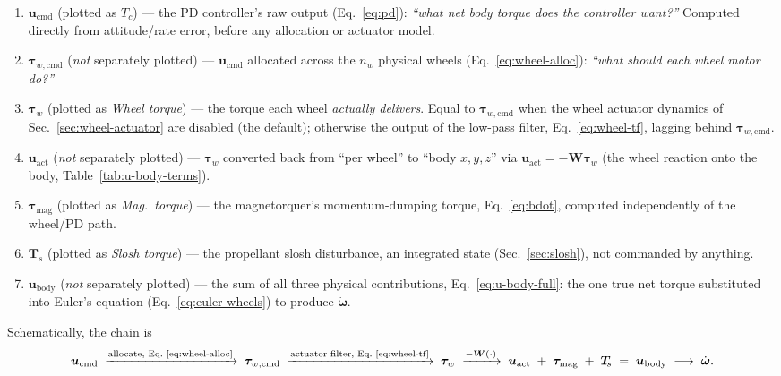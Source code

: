 \begin{enumerate}\setlength{\itemsep}{4pt}
\item $\bm{u}_{\text{cmd}}$ (plotted as $T_c$) --- the PD controller's
      raw output (Eq.~\ref{eq:pd}): \emph{``what net body torque does the
      controller want?''} Computed directly from attitude/rate error,
      before any allocation or actuator model.
\item $\bm{\tau}_{w,\text{cmd}}$ (\emph{not} separately plotted) ---
      $\bm{u}_{\text{cmd}}$ allocated across the $n_w$ physical wheels
      (Eq.~\ref{eq:wheel-alloc}): \emph{``what should each wheel motor
      do?''}
\item $\bm{\tau}_w$ (plotted as \emph{Wheel torque}) --- the torque each
      wheel \emph{actually delivers}. Equal to $\bm{\tau}_{w,\text{cmd}}$
      when the wheel actuator dynamics of Sec.~\ref{sec:wheel-actuator}
      are disabled (the default); otherwise the output of the low-pass
      filter, Eq.~\ref{eq:wheel-tf}, lagging behind
      $\bm{\tau}_{w,\text{cmd}}$.
\item $\bm{u}_{\text{act}}$ (\emph{not} separately plotted) --- $\bm{\tau}_w$
      converted back from ``per wheel'' to ``body $x,y,z$'' via
      $\bm{u}_{\text{act}} = -\bm{W}\bm{\tau}_w$ (the wheel reaction onto
      the body, Table~\ref{tab:u-body-terms}).
\item $\bm{\tau}_{\text{mag}}$ (plotted as \emph{Mag.\ torque}) --- the
      magnetorquer's momentum-dumping torque, Eq.~\ref{eq:bdot},
      computed independently of the wheel/PD path.
\item $\bm{T}_{\!s}$ (plotted as \emph{Slosh torque}) --- the propellant
      slosh disturbance, an integrated state (Sec.~\ref{sec:slosh}), not
      commanded by anything.
\item $\bm{u}_{\text{body}}$ (\emph{not} separately plotted) --- the sum
      of all three physical contributions, Eq.~\ref{eq:u-body-full}: the
      one true net torque substituted into Euler's equation
      (Eq.~\ref{eq:euler-wheels}) to produce $\dot{\bm{\omega}}$.
\end{enumerate}

Schematically, the chain is
\begin{equation}
\bm{u}_{\text{cmd}}
\;\xrightarrow{\text{allocate, Eq.~\ref{eq:wheel-alloc}}}\;
\bm{\tau}_{w,\text{cmd}}
\;\xrightarrow{\text{actuator filter, Eq.~\ref{eq:wheel-tf}}}\;
\bm{\tau}_w
\;\xrightarrow{-\bm{W}(\cdot)}\;
\bm{u}_{\text{act}}
\;+\;
\bm{\tau}_{\text{mag}}
\;+\;
\bm{T}_{\!s}
\;=\;
\bm{u}_{\text{body}}
\;\longrightarrow\;
\dot{\bm{\omega}}.
\label{eq:torque-chain}
\end{equation}

